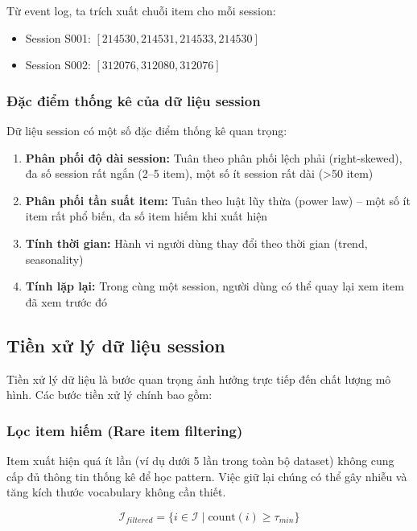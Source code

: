 \documentclass[12pt, a4paper]{article}
\begin{document}
Từ event log, ta trích xuất chuỗi item cho mỗi session:
\begin{itemize}
    \item Session S001: $[214530, 214531, 214533, 214530]$
    \item Session S002: $[312076, 312080, 312076]$
\end{itemize}

\subsubsection{Đặc điểm thống kê của dữ liệu session}

Dữ liệu session có một số đặc điểm thống kê quan trọng:

\begin{enumerate}
    \item \textbf{Phân phối độ dài session:} Tuân theo phân phối lệch phải (right-skewed), đa số session rất ngắn (2--5 item), một số ít session rất dài (>50 item)
    \item \textbf{Phân phối tần suất item:} Tuân theo luật lũy thừa (power law) -- một số ít item rất phổ biến, đa số item hiếm khi xuất hiện
    \item \textbf{Tính thời gian:} Hành vi người dùng thay đổi theo thời gian (trend, seasonality)
    \item \textbf{Tính lặp lại:} Trong cùng một session, người dùng có thể quay lại xem item đã xem trước đó
\end{enumerate}


\subsection{Tiền xử lý dữ liệu session}

Tiền xử lý dữ liệu là bước quan trọng ảnh hưởng trực tiếp đến chất lượng mô hình. Các bước tiền xử lý chính bao gồm:

\subsubsection{Lọc item hiếm (Rare item filtering)}

Item xuất hiện quá ít lần (ví dụ dưới 5 lần trong toàn bộ dataset) không cung cấp đủ thông tin thống kê để học pattern. Việc giữ lại chúng có thể gây nhiễu và tăng kích thước vocabulary không cần thiết.

\begin{equation}
    \mathcal{I}_{filtered} = \{i \in \mathcal{I} \;|\; \text{count}(i) \geq \tau_{min}\}
    \label{eq:filter_item}
\end{equation}
\end{document}
